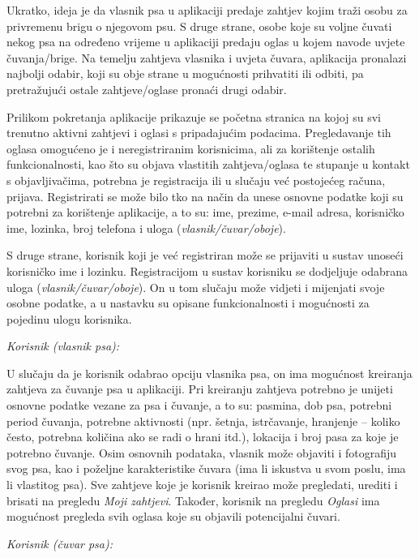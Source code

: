 		Ukratko, ideja je da vlasnik psa u aplikaciji predaje zahtjev kojim traži osobu za privremenu brigu o njegovom psu. S druge strane, osobe koje su voljne čuvati nekog psa na određeno vrijeme u aplikaciji predaju oglas u kojem navode uvjete čuvanja/brige. Na temelju zahtjeva vlasnika i uvjeta čuvara, aplikacija pronalazi najbolji odabir, koji su obje strane u mogućnosti prihvatiti ili odbiti, pa pretražujući  ostale zahtjeve/oglase pronaći drugi odabir. 
		
		Prilikom pokretanja aplikacije prikazuje se početna stranica na kojoj su svi trenutno aktivni zahtjevi i oglasi s pripadajućim podacima. Pregledavanje tih oglasa omogućeno je i neregistriranim korisnicima, ali za korištenje ostalih funkcionalnosti, kao što su objava vlastitih zahtjeva/oglasa te stupanje u kontakt s objavljivačima, potrebna je registracija ili u slučaju već postojećeg računa, prijava. Registrirati se može bilo tko na način da unese osnovne podatke koji su potrebni za korištenje aplikacije, a to su: ime, prezime, e-mail adresa, korisničko ime, lozinka, broj telefona i uloga (\textit{vlasnik/čuvar/oboje}). 
		
		S druge strane, korisnik koji je već registriran može se prijaviti u sustav unoseći korisničko ime i lozinku. Registracijom u sustav korisniku se dodjeljuje odabrana uloga (\textit{vlasnik/čuvar/oboje}). On u tom slučaju može vidjeti i mijenjati svoje osobne podatke, a u nastavku su opisane funkcionalnosti i mogućnosti za pojedinu ulogu korisnika. 
		
		\textit{Korisnik (vlasnik psa):}
		
		U slučaju da je korisnik odabrao opciju vlasnika psa, on ima mogućnost kreiranja zahtjeva za čuvanje psa u aplikaciji. Pri kreiranju zahtjeva potrebno je unijeti osnovne podatke vezane za psa i čuvanje, a to su: pasmina, dob psa, potrebni period čuvanja, potrebne aktivnosti (npr. šetnja, istrčavanje, hranjenje – koliko često, potrebna količina ako se radi o hrani itd.), lokacija i broj pasa za koje je potrebno čuvanje. Osim osnovnih podataka, vlasnik može objaviti i fotografiju svog psa, kao i poželjne karakteristike čuvara (ima li iskustva u svom poslu, ima li vlastitog psa). Sve zahtjeve koje je korisnik kreirao može pregledati, urediti i brisati na pregledu \textit{Moji zahtjevi}. Također, korisnik na pregledu \textit{Oglasi} ima mogućnost pregleda svih oglasa koje su objavili potencijalni čuvari.
		
		\textit{Korisnik (čuvar psa):}
		
